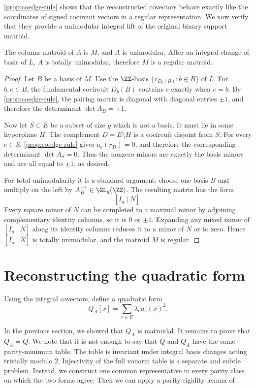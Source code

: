 \documentclass[11pt,letterpaper]{amsart}
\begin{document}
\cref{prop:coedge-rule} shows that the reconstructed covectors behave exactly like the coordinates of signed cocircuit vectors in a regular representation. We now verify that they provide a unimodular integral lift of the original binary support matroid.

\begin{theorem}\label{thm:A-unimodular}
The column matroid of $A$ is $M$, and $A$ is unimodular. After an integral change of basis of $L$, $A$ is totally unimodular, therefore $M$ is a regular matroid.
\end{theorem}
\begin{proof}
    Let $B$ be a basis of $M$.  Use the $\ZZ$-basis $\{r_{D_b(B)}:b\in B\}$ of $L$.  For $b,e\in B$, the fundamental cocircuit $D_b(B)$ contains $e$ exactly when $e=b$.  By \cref{prop:coedge-rule}, the pairing matrix is diagonal with diagonal entries $\pm1$, and therefore the determinant $\det A_B=\pm1$. 

    Now let $S \subset E$ be a subset of size $g$ which is not a basis. It must lie in some hyperplane $H$. The complement $D=E\setminus H$ is a cocircuit disjoint from $S$.  For every $e\in S$, \cref{prop:coedge-rule} gives $a_e(r_D)=0$, and therefore the corresponding determinant $\det A_S = 0$. Thus the nonzero minors are exactly the basis minors and are all equal to $\pm 1$, as desired.

    For total unimodularity it is a standard argument: choose one basis $B$ and multiply on the left by $A_B^{-1}\in\GL_g(\ZZ)$.  The resulting matrix has the form
\[
  [I_g\mid N].
\]
Every square minor of $N$ can be completed to a maximal minor by adjoining complementary identity columns, so it is $0$ or $\pm1$.  Expanding any mixed minor of $[I_g\mid N]$ along its identity columns reduces it to a minor of $N$ or to zero.  Hence $[I_g\mid N]$ is totally unimodular, and the matroid $M$ is regular.
\end{proof}



\section{Reconstructing the quadratic form}\label{sec:reconstructing}

Using the integral covectors, define a quadratic form
\begin{equation*}
  Q_A[x]=\sum_{e\in E}\lambda_e a_e(x)^2.
\end{equation*}

In the previous section, we showed that $Q_A$ is matroidal. It remains to prove that $Q_A=Q$. We note that it is not enough to say that $Q$ and $Q_A$ have the same parity-minimum table. The table is invariant under integral basis changes acting trivially modulo 2. Injectivity of the full vonorm table is a separate and subtle problem.  Instead, we construct one common representative in every parity class on which the two forms agree. Then we can apply a parity-rigidity lemma of \cite{sikiric2022iso}.
\end{document}
